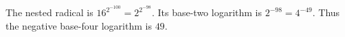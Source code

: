The nested radical is $16^{2^{-100}}=2^{2^{-98}}$. Its base-two logarithm is $2^{-98}=4^{-49}$. Thus the negative base-four logarithm is $\boxed{49}$.
